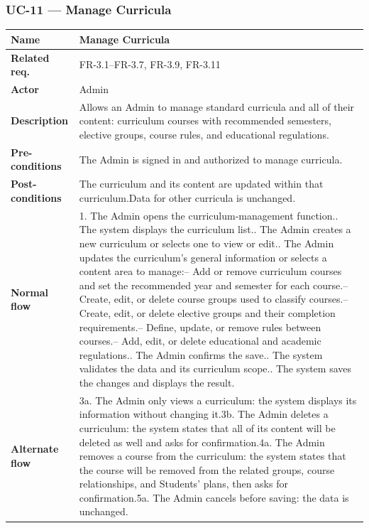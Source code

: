 \subsubsection{UC-11 --- Manage Curricula}
\begin{longtable}{|p{}|p{}|}
\hline
\textbf{Name} & Manage Curricula \\
\hline
\textbf{Related req.} & FR-3.1--FR-3.7, FR-3.9, FR-3.11 \\
\hline
\textbf{Actor} & Admin \\
\hline
\textbf{Description} & Allows an Admin to manage standard curricula and all of their content: curriculum courses with recommended semesters, elective groups, course rules, and educational regulations. \\
\hline
\textbf{Pre-conditions} & The Admin is signed in and authorized to manage curricula. \\
\hline
\textbf{Post-conditions} & The curriculum and its content are updated within that curriculum.\newline Data for other curricula is unchanged. \\
\hline
\textbf{Normal flow} & 1. The Admin opens the curriculum-management function.\newline 2. The system displays the curriculum list.\newline 3. The Admin creates a new curriculum or selects one to view or edit.\newline 4. The Admin updates the curriculum's general information or selects a content area to manage:\newline \quad -- Add or remove curriculum courses and set the recommended year and semester for each course.\newline \quad -- Create, edit, or delete course groups used to classify courses.\newline \quad -- Create, edit, or delete elective groups and their completion requirements.\newline \quad -- Define, update, or remove rules between courses.\newline \quad -- Add, edit, or delete educational and academic regulations.\newline 5. The Admin confirms the save.\newline 6. The system validates the data and its curriculum scope.\newline 7. The system saves the changes and displays the result. \\
\hline
\textbf{Alternate flow} & 3a. The Admin only views a curriculum: the system displays its information without changing it.\newline 3b. The Admin deletes a curriculum: the system states that all of its content will be deleted as well and asks for confirmation.\newline 4a. The Admin removes a course from the curriculum: the system states that the course will be removed from the related groups, course relationships, and Students' plans, then asks for confirmation.\newline 5a. The Admin cancels before saving: the data is unchanged. \\

\end{longtable}
